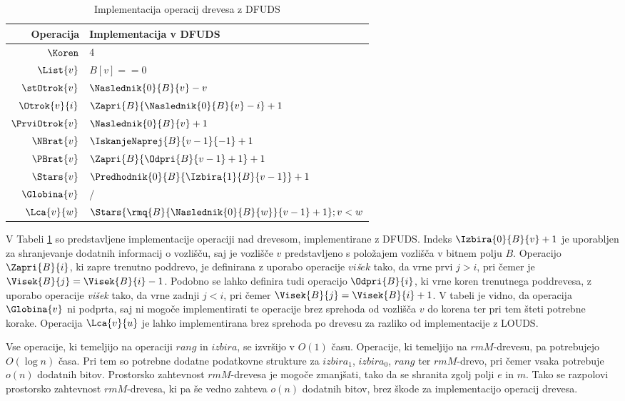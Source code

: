 \begin{table}[htb]
    \centering
    \caption{Implementacija operacij drevesa z DFUDS}
    \begin{tabular}{r|l}
\textbf{Operacija}& \textbf{Implementacija v DFUDS} \\\hline
         $\Koren$ &          $4$\\
         $\List{v}$ &        $B[v]==0$\\
         $\stOtrok{v}$&      $\Naslednik{0}{B}{v}-v$\\
         $\Otrok{v}{i}$ &    $\Zapri{B}{\Naslednik{0}{B}{v} - i}+1$\\
         $\PrviOtrok{v}$&     $\Naslednik{0}{B}{v}+1$\\
         $\NBrat{v}$ &       $\IskanjeNaprej{B}{v-1}{-1}+1$ \\
         $\PBrat{v}$ &       $\Zapri{B}{\Odpri{B}{v-1}+1}+1$ \\
         $\Stars{v}$ &        $\Predhodnik{0}{B}{\Izbira{1}{B}{v-1}}+1$ \\
         $\Globina{v}$ &         / \\
         $\Lca{v}{w}$ &      $\Stars{\rmq{B}{\Naslednik{0}{B}{w}}{v-1}+1};v<w$\\

    \end{tabular}
    \label{tab:DFUDSop}
\end{table}

V Tabeli \ref{tab:DFUDSop} so predstavljene implementacije operaciji nad drevesom, implementirane z DFUDS. Indeks $\Izbira{0}{B}{v}+1$ je uporabljen za shranjevanje dodatnih informacij o vozlišču, saj je vozlišče $v$ predstavljeno s položajem vozlišča v bitnem polju $B$. Operacijo $\Zapri{B}{i}$, ki zapre trenutno poddrevo, je definirana z uporabo operacije $vi$\textit{š}$ek$ tako, da vrne prvi $j>i$, pri čemer je $\Visek{B}{j}=\Visek{B}{i}-1$. Podobno se lahko definira tudi operacijo $\Odpri{B}{i}$, ki vrne koren trenutnega poddrevesa, z uporabo operacije \textit{višek} tako, da vrne zadnji $j<i$, pri čemer $\Visek{B}{j}=\Visek{B}{i}+1$. V tabeli je vidno, da operacija $\Globina{v}$ ni podprta, saj ni mogoče implementirati te operacije brez sprehoda od vozlišča $v$ do korena ter pri tem šteti potrebne korake. Operacija $\Lca{v}{u}$ je lahko implementirana brez sprehoda po drevesu za razliko od implementacije z LOUDS.

Vse operacije, ki temeljijo na operaciji $rang$ in $izbira$, se izvršijo v $O(1)$ času. Operacije, ki temeljijo na $rmM$-drevesu, pa potrebujejo $O(\log{n})$ časa. Pri tem so potrebne dodatne podatkovne strukture za $izbira_1$, $izbira_0$, $rang$ ter $rmM$-drevo, pri čemer vsaka potrebuje $o(n)$ dodatnih bitov. Prostorsko zahtevnost $rmM$-drevesa je mogoče zmanjšati, tako da se shranita zgolj polji $e$ in $m$. Tako se razpolovi prostorsko zahtevnost $rmM$-drevesa, ki pa še vedno zahteva $o(n)$ dodatnih bitov, brez škode za implementacijo operacij drevesa.

